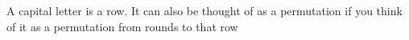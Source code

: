 \documentclass[preview]{standalone}
\begin{document}
\begin{flushleft}
A capital letter is a row. It can also be thought of as a permutation if you think of it as a permutation from rounds to that row
\end{flushleft}
\end{document}
